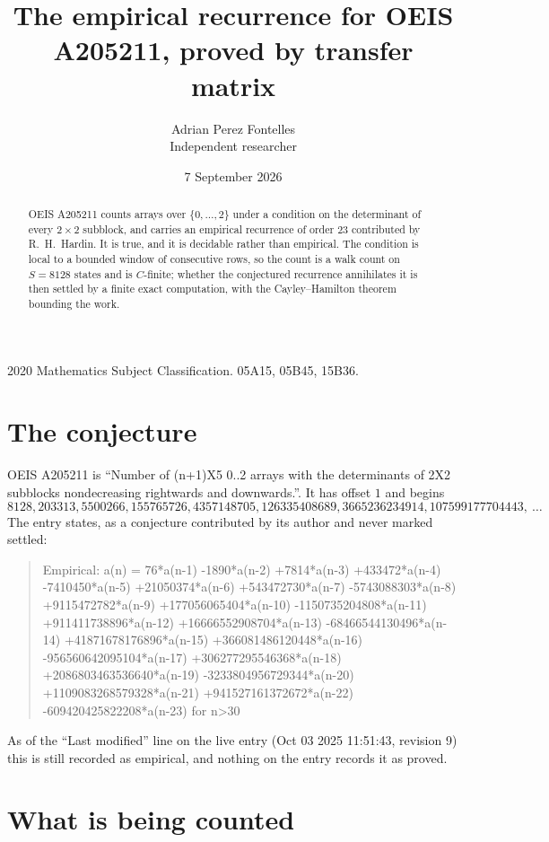 \documentclass[11pt,a4paper]{article}
\title{The empirical recurrence for OEIS A205211, proved by transfer matrix}
\author{Adrian Perez Fontelles\\ \small Independent researcher}
\date{7 September 2026}
\theoremstyle{plain}
\theoremstyle{definition}
\begin{document}
\maketitle

\begin{abstract}
OEIS A205211 counts arrays over $\{0,\dots,2\}$ under a condition on the determinant of every
$2\times2$ subblock, and carries an empirical recurrence of order $23$ contributed by
R.~H.~Hardin. It is true, and it is decidable rather than empirical. The condition is local to
a bounded window of consecutive rows, so the count is a walk count on $S=8128$ states and is
$C$-finite; whether the conjectured recurrence annihilates it is then settled by a finite exact
computation, with the Cayley--Hamilton theorem bounding the work.
\end{abstract}

\noindent\small 2020 Mathematics Subject Classification. 05A15, 05B45, 15B36.\normalsize

\section{The conjecture}

OEIS A205211 is ``Number of (n+1)X5 0..2 arrays with the determinants of 2X2 subblocks nondecreasing rightwards and downwards.''. It has offset $1$ and begins
\[
8128, 203313, 5500266, 155765726, 4357148705, 126335408689, 3665236234914, 107599177704443,\ \dots
\]
The entry states, as a conjecture contributed by its author and never marked settled:
\begin{quote}
Empirical: a(n) = 76*a(n-1) -1890*a(n-2) +7814*a(n-3) +433472*a(n-4) -7410450*a(n-5) +21050374*a(n-6) +543472730*a(n-7) -5743088303*a(n-8) +9115472782*a(n-9) +177056065404*a(n-10) -1150735204808*a(n-11) +911411738896*a(n-12) +16666552908704*a(n-13) -68466544130496*a(n-14) +41871678176896*a(n-15) +366081486120448*a(n-16) -956560642095104*a(n-17) +306277295546368*a(n-18) +2086803463536640*a(n-19) -3233804956729344*a(n-20) +1109083268579328*a(n-21) +941527161372672*a(n-22) -609420425822208*a(n-23) for n>30
\end{quote}
As of the ``Last modified'' line on the live entry (Oct 03 2025 11:51:43, revision 9) this is still
recorded as empirical, and nothing on the entry records it as proved.

\section{What is being counted}
\end{document}
